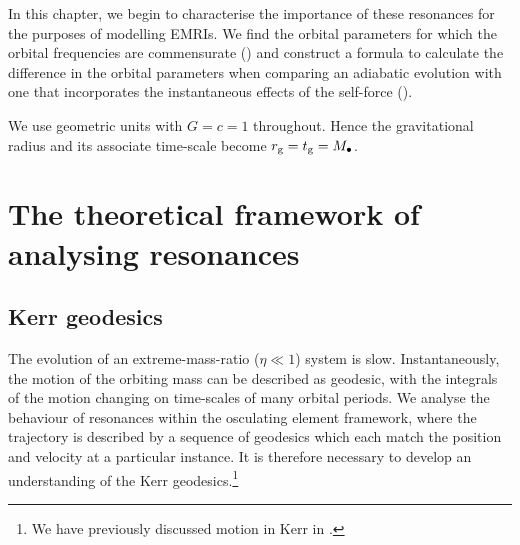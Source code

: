 In this chapter, we begin to characterise the importance of these resonances for the purposes of modelling EMRIs. We find the orbital parameters for which the orbital frequencies are commensurate () and construct a formula to calculate the difference in the orbital parameters when comparing an adiabatic evolution with one that incorporates the instantaneous effects of the self-force ().

We use geometric units with $G = c = 1$ throughout. Hence the gravitational radius and its associate time-scale become $r_\mathrm{g} = t_\mathrm{g} = M_\bullet$.

\section{The theoretical framework of analysing resonances}

\subsection{Kerr geodesics}

The evolution of an extreme-mass-ratio ($\eta \ll 1$) system is slow. Instantaneously, the motion of the orbiting mass can be described as geodesic, with the integrals of the motion changing on time-scales of many orbital periods. We analyse the behaviour of resonances within the osculating element framework, where the trajectory is described by a sequence of geodesics which each match the position and velocity at a particular instance. It is therefore necessary to develop an understanding of the Kerr geodesics.\footnote{We have previously discussed motion in Kerr in .}

